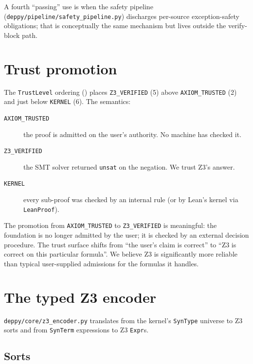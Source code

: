 A fourth ``passing'' use is when the safety pipeline
(\texttt{deppy/pipeline/safety\_pipeline.py}) discharges per-source
exception-safety obligations; that is conceptually the same
mechanism but lives outside the verify-block path.

\section{Trust promotion}
\label{sec:z3-trust}

The \texttt{TrustLevel} ordering () places
\texttt{Z3\_VERIFIED} (5) above \texttt{AXIOM\_TRUSTED} (2) and
just below \texttt{KERNEL} (6).  The semantics:

\begin{description}
  \item[\texttt{AXIOM\_TRUSTED}] the proof is admitted on the user's
    authority.  No machine has checked it.
  \item[\texttt{Z3\_VERIFIED}] the SMT solver returned
    \texttt{unsat} on the negation.  We trust Z3's answer.
  \item[\texttt{KERNEL}] every sub-proof was checked by an internal
    rule (or by Lean's kernel via \texttt{LeanProof}).
\end{description}

The promotion from \texttt{AXIOM\_TRUSTED} to
\texttt{Z3\_VERIFIED} is meaningful: the foundation is no longer
admitted by the user; it is checked by an external decision
procedure.  The trust surface shifts from ``the user's claim is
correct'' to ``Z3 is correct on this particular formula''.  We
believe Z3 is significantly more reliable than typical user-supplied
admissions for the formulas it handles.

\section{The typed Z3 encoder}
\label{sec:typed-z3}

\texttt{deppy/core/z3\_encoder.py} translates from the kernel's
\texttt{SynType} universe to Z3 sorts and from \texttt{SynTerm}
expressions to Z3 \texttt{Expr}s.

\subsection{Sorts}

